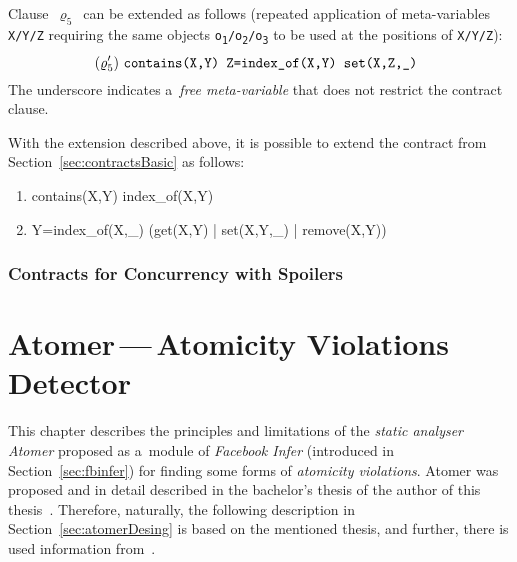 Clause~$ \varrho_5 $~can be extended as follows (repeated application of
meta-variables \texttt{X/Y/Z} requiring the same objects
\texttt{o\textsubscript{1}/o\textsubscript{2}/o\textsubscript{3}} to be used
at the positions of \texttt{X/Y/Z}):
$$
    (\varrho'_5)\ \text{\texttt{%
        contains(X,Y) Z=index\_of(X,Y) set(X,Z,\_)
    }}
$$
The underscore indicates a~\emph{free meta-variable} that does not restrict
the contract clause.

With the extension described above, it is possible to extend the contract
from Section~\ref{sec:contractsBasic} as follows:
\begin{enumerate}[label={$ (\varrho'_{\arabic*}) $}]
    \tt

    \item contains(X,Y) index\_of(X,Y)
    \item Y=index\_of(X,\_) (get(X,Y) | set(X,Y,\_) | remove(X,Y))
\end{enumerate}

\subsection{Contracts for Concurrency with Spoilers}
\label{sec:contractsSpoilers}

\cite{staticRaceDetectorTruePositives}
\cite{inferCSharp}
\cite{contract}
\cite{inferBiabduction}
\cite{controlFlowAnalysisAllen}
\cite{AIBasedFormalMethodsCousot}
\cite{AILatticeModelCousot}
\cite{wideningNarrowingCousot}
\cite{AIInNutshellCousot}
\cite{AICousotWeb}
\cite{inferAISpeech}
\cite{racerDOnline}
\cite{inferboOnline}
\cite{marcinBP}
\cite{DFAGraphReach}
\cite{contracts2015}
\cite{programAnalysisNielson}
\cite{racerD}
\cite{realWorldOCaml}
\cite{deadlockKroening}
\cite{staticAnalysisRival}
\cite{staticAnalysisMoller}
\cite{DFAApproaches}
\cite{savAI}
\cite{hoare}
\cite{anaconda}



\chapter{\texorpdfstring{Atomer\,---\,Atomicity Violations Detector}{%
    Atomer - Atomicity Violations Detector%
}}
\label{chap:atomer}

This chapter describes the principles and limitations of the \emph{static
analyser} \emph{Atomer} proposed as a~module of \emph{Facebook Infer}
(introduced in Section~\ref{sec:fbinfer}) for finding some forms of
\emph{atomicity violations}. Atomer was proposed and in detail described in the
bachelor's thesis of the author of this thesis~\cite{harmimBP}. Therefore,
naturally, the following description in Section~\ref{sec:atomerDesing} is based
on the mentioned thesis, and further, there is used information
from~\cite{excel2021Harmim}.

